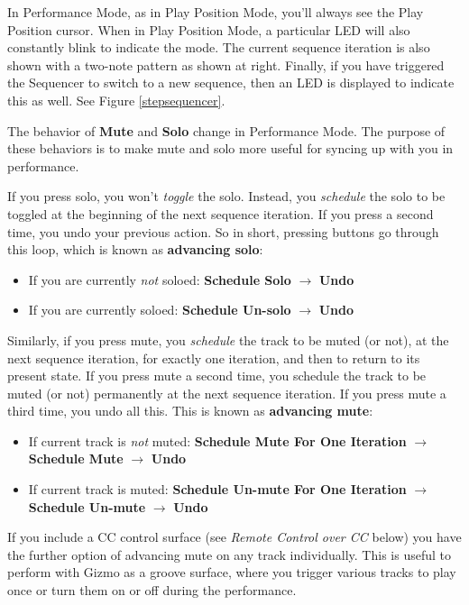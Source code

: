 \documentclass{article}
\begin{document}
In Performance Mode, as in Play Position Mode, you'll always see the Play Position cursor.  When in Play Position Mode, a particular LED will also constantly blink to indicate the mode.  The current sequence iteration is also shown with a two-note pattern as shown at right.  Finally, if you have triggered the Sequencer to switch to a new sequence, then an LED is displayed to indicate this as well. See Figure \ref{stepsequencer}.

The behavior of {\bf Mute} and {\bf Solo} change in Performance Mode. The purpose of these behaviors is to make mute and solo more useful for syncing up with you in performance.

If you press solo, you won't {\it toggle} the solo.  Instead, you {\it schedule} the solo to be toggled at the beginning of the next sequence iteration.  If you press a second time, you undo your previous action.  So in short, pressing buttons go through this loop, which is known as {\bf advancing solo}:

\begin{itemize}
\item If you are currently {\it not} soloed: {\bf Schedule Solo} \(\rightarrow\) {\bf Undo}
\item If you are currently soloed: {\bf Schedule Un-solo} \(\rightarrow\) {\bf Undo}
\end{itemize}

Similarly, if you press mute, you {\it schedule} the track to be muted (or not), at the next sequence iteration, for exactly one iteration, and then to return to its present state.  If you press mute a second time, you schedule the track to be muted (or not) permanently at the next sequence iteration.  If you press mute a third time, you undo all this.  This is known as {\bf advancing mute}:

\begin{itemize}
\item If current track is {\it not} muted: {\bf Schedule Mute For One Iteration} \(\rightarrow\)  {\bf Schedule Mute} \(\rightarrow\) {\bf Undo}
\item If current track is muted: {\bf Schedule Un-mute For One Iteration} \(\rightarrow\)  {\bf Schedule Un-mute} \(\rightarrow\) {\bf Undo}
\end{itemize}

If you include a CC control surface (see {\it Remote Control over CC} below) you have the further option of advancing mute on any track individually.  This is useful to perform with Gizmo as a groove surface, where you trigger various tracks to play once or turn them on or off during the performance.
\end{document}
